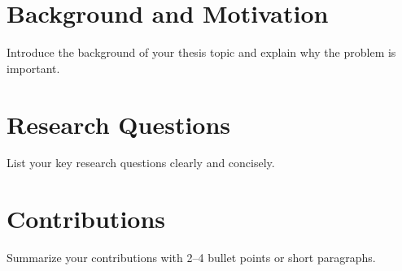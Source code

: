 \section{Background and Motivation}

Introduce the background of your thesis topic and explain why the problem is important.

\section{Research Questions}

List your key research questions clearly and concisely.

\section{Contributions}

Summarize your contributions with 2--4 bullet points or short paragraphs.
